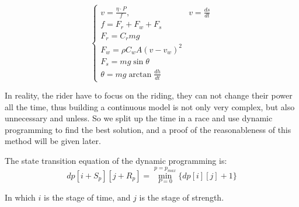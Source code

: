 \documentclass[12pt]{article}
\begin{document}
\begin{equation}
    \left\{
    \begin{array}{cc}
        v=\frac{\eta \cdot P}{f} ,      & v=\frac{d s}{d t} \\
        f=F_r+F_w+F_s                   &                   \\
        F_r=C_rmg                       &                   \\
        F_w=\rho C_w A(v-v_w)^2         &                   \\
        F_s=mg\sin \theta               &                   \\
        \theta=mg\arctan\frac{d h}{d t} &
    \end{array}
    \right.
\end{equation}

In reality, the rider have to focus on the riding, they can not change their power all the time, thus building a continuous model is not only very complex, 
but also unnecessary and unless. So we split up the time in a race and use dynamic programming to find the best solution, 
and a proof of the reasonableness of this method will be given later.

The state transition equation of the dynamic programming is:$$dp[i+S_p][j+R_p]=\min^{p=p_{max}}_{P=0}\{dp[i][j]+1\}$$

In which $i$ is the stage of time, and $j$ is the stage of strength.
\end{document}
